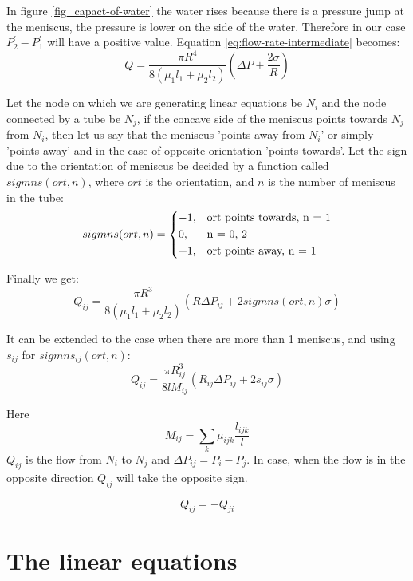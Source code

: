 \documentclass[12pt]{article}
\begin{document}
	In figure \ref{fig_capact-of-water} the water rises because there is a pressure jump at the meniscus, the pressure is lower on the side of the water. Therefore in our case $P^{'}_2 - P^{'}_1$ will have a positive value. Equation \ref{eq:flow-rate-intermediate} becomes:
	\begin{equation}
	Q = \frac{\pi R^4}{8({\mu}_1 l_1 + {\mu}_2 l_2)}(\Delta P + \frac{2\sigma}{R})
	\end{equation}

	Let the node on which we are generating linear equations be $N_i$ and the node connected by a tube be $N_j$, if the concave side of the meniscus points towards $N_j$ from $N_i$, then let us say that the meniscus 'points away from $N_i$' or simply 'points away' and in the case of opposite orientation 'points towards'. Let the sign due to the orientation of meniscus be decided by a function called $sigmns(ort, n)$, where $ort$ is the orientation, and $n$ is the number of meniscus in the tube:
	\begin{equation}
	sigmns(ort, n) = 
	\begin{dcases}
	-1,&\text{ort points towards, n = 1}\\
	0,&\text{n = 0, 2}\\
	+1,&\text{ort points away, n = 1}
	\end{dcases}
	\end{equation}

	Finally we get:
	\begin{equation} 
	Q_{ij} = \frac{\pi R^3}{8({\mu}_1 l_1 + {\mu}_2 l_2)}(R\Delta P_{ij} + 2sigmns(ort, n)\sigma)
	\end{equation}

	It can be extended to the case when there are more than 1 meniscus, and using $s_{ij}$ for $sigmns_{ij}(ort, n)$:
	\begin{equation} \label{eq:flow-rate-main}
	\boxed{Q_{ij} = \frac{\pi R_{ij}^3}{8lM_{ij}}(R_{ij}\Delta P_{ij} + 2s_{ij}\sigma)}
	\end{equation}

	Here
	\[ M_{ij} = \sum\limits_{k}{\mu}_{ijk} \frac{l_{ijk}}{l} \]
	$Q_{ij}$ is the flow from $N_i$ to $N_j$ and $\Delta P_{ij} = P_i - P_j$. In case, when the flow is in the opposite direction $Q_{ij}$ will take the opposite sign.

	\begin{equation}
	Q_{ij} = -Q_{ji}
	\end{equation}


\section{The linear equations} \label{sec:linear-equ}
\end{document}
